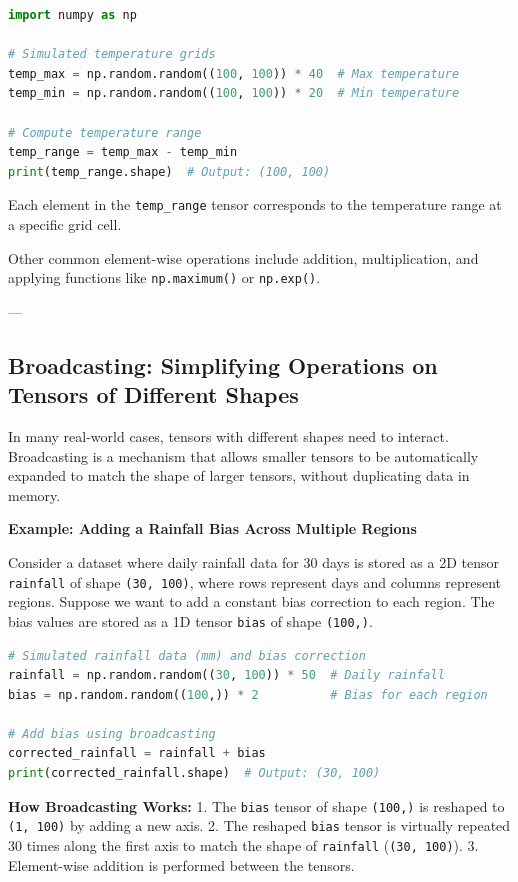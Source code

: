 \begin{lstlisting}[language=Python]
import numpy as np

# Simulated temperature grids
temp_max = np.random.random((100, 100)) * 40  # Max temperature
temp_min = np.random.random((100, 100)) * 20  # Min temperature

# Compute temperature range
temp_range = temp_max - temp_min
print(temp_range.shape)  # Output: (100, 100)
\end{lstlisting}

Each element in the \texttt{temp\_range} tensor corresponds to the temperature range at a specific grid cell.

Other common element-wise operations include addition, multiplication, and applying functions like \texttt{np.maximum()} or \texttt{np.exp()}.

---

\subsection{Broadcasting: Simplifying Operations on Tensors of Different Shapes}

In many real-world cases, tensors with different shapes need to interact. Broadcasting is a mechanism that allows smaller tensors to be automatically expanded to match the shape of larger tensors, without duplicating data in memory.

\textbf{Example: Adding a Rainfall Bias Across Multiple Regions}

Consider a dataset where daily rainfall data for 30 days is stored as a 2D tensor \texttt{rainfall} of shape \texttt{(30, 100)}, where rows represent days and columns represent regions. Suppose we want to add a constant bias correction to each region. The bias values are stored as a 1D tensor \texttt{bias} of shape \texttt{(100,)}.

\begin{lstlisting}[language=Python]
# Simulated rainfall data (mm) and bias correction
rainfall = np.random.random((30, 100)) * 50  # Daily rainfall
bias = np.random.random((100,)) * 2          # Bias for each region

# Add bias using broadcasting
corrected_rainfall = rainfall + bias
print(corrected_rainfall.shape)  # Output: (30, 100)
\end{lstlisting}

\textbf{How Broadcasting Works:}
1. The \texttt{bias} tensor of shape \texttt{(100,)} is reshaped to \texttt{(1, 100)} by adding a new axis.
2. The reshaped \texttt{bias} tensor is virtually repeated 30 times along the first axis to match the shape of \texttt{rainfall} (\texttt{(30, 100)}).
3. Element-wise addition is performed between the tensors.

